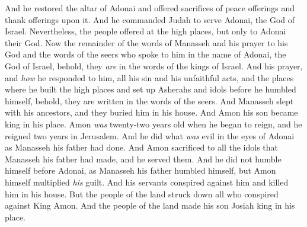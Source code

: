 \begin{biblechapter}
\verse And he restored the altar of Adonai and offered sacrifices of peace offerings and thank offerings upon it. And he commanded Judah to serve Adonai, the God of Israel.
\verse Nevertheless, the people offered at the high places, but only to Adonai their God.
\verse Now the remainder of the words of Manasseh and his prayer to his God and the words of the seers who spoke to him in the name of Adonai, the God of Israel, behold, they \textit{are} in the words of the kings of Israel.
\verse And his prayer, and \textit{how} he responded to him, all his sin and his unfaithful acts, and the places where he built the high places and set up Asherahs and idols before he humbled himself, behold, they are written in the words of the seers.
 And Manasseh slept with his ancestors, and they buried him in his house. And Amon his son became king in his place.
\verse Amon \textit{was} twenty-two years old when he began to reign, and he reigned two years in Jerusalem.
\verse And he did what \textit{was} evil in the eyes of Adonai as Manasseh his father had done. And Amon sacrificed to all the idols that Manasseh his father had made, and he served them.
\verse And he did not humble himself before Adonai, as Manasseh his father humbled himself, but Amon himself multiplied \textit{his} guilt.
\verse And his servants conspired against him and killed him in his house.
\verse But the people of the land struck down all who conspired against King Amon. And the people of the land made his son Josiah king in his place.
\end{biblechapter}


